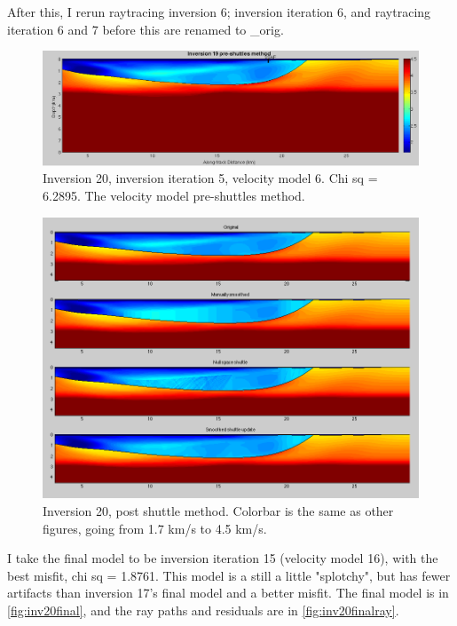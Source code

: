 \documentclass[fontsize=11pt, %
                             paper=a4, %
                             twoside, %
                             captions=tableheading,
                             index=totoc,
                             hyperref]{labbook}
\begin{document}
\begin{addmargin}[4cm]{0cm}
After this, I rerun raytracing inversion 6; inversion iteration 6, and raytracing iteration 6 and 7 before this are renamed to \_orig.

\begin{figure}[h!]
\raggedleft
\includegraphics[scale=0.4,keepaspectratio=true]{figs/inv20_preshut.png}
\caption{Inversion 20, inversion iteration 5, velocity model 6.  Chi sq = 6.2895.  The velocity model pre-shuttles method.}
\label{fig:inv20preshut}
\end{figure} 

\begin{figure}[h!]
\raggedleft
\includegraphics[scale=0.4,keepaspectratio=true]{figs/inv20_postshuttle.png}
\caption{Inversion 20, post shuttle method.  Colorbar is the same as other figures, going from 1.7 km/s to 4.5 km/s.}
\label{fig:inv20postshut}
\end{figure} 

I take the final model to be inversion iteration 15 (velocity model 16), with the best misfit, chi sq = 1.8761.  This model is a still a little "splotchy", but has fewer artifacts than inversion 17's final model and a better misfit.  The final model is in \autoref{fig:inv20final}, and the ray paths and residuals are in \autoref{fig:inv20finalray}.


\end{addmargin}
\end{document}

